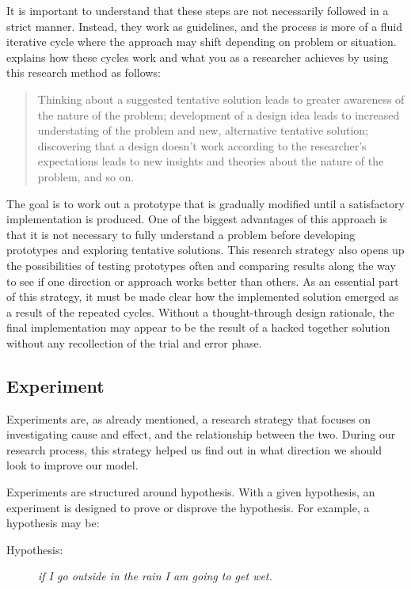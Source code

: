It is important to understand that these steps are not necessarily followed in a strict manner. Instead, they work as guidelines, and the process is more of a fluid iterative cycle where the approach may shift depending on problem or situation. \citep{oates2005researching} explains how these cycles work and what you as a researcher achieves by using this research method as follows:

\begin{quote}
    Thinking about a suggested tentative solution leads to greater awareness of the nature of the problem; development of a design idea leads to increased understating of the problem and new, alternative tentative solution; discovering that a design doesn't work according to the researcher's expectations leads to new insights and theories about the nature of the problem, and so on. 
\end{quote}

The goal is to work out a prototype that is gradually modified until a satisfactory implementation is produced. One of the biggest advantages of this approach is that it is not necessary to fully understand a problem before developing prototypes and exploring tentative solutions. This research strategy also opens up the possibilities of testing prototypes often and comparing results along the way to see if one direction or approach works better than others. As an essential part of this strategy, it must be made clear how the implemented solution emerged as a result of the repeated cycles. Without a thought-through design rationale, the final implementation may appear to be the result of a hacked together solution without any recollection of the trial and error phase.

\subsection{Experiment}
\label{sec:experiment}
Experiments are, as already mentioned, a research strategy that focuses on investigating cause and effect, and the relationship between the two. During our research process, this strategy helped us find out in what direction we should look to improve our model.

Experiments are structured around hypothesis. With a given hypothesis, an experiment is designed to prove or disprove the hypothesis. For example, a hypothesis may be:

\begin{description}
    \item[Hypothesis:]{\textit{if I go outside in the rain I am going to get wet.}}
\end{description}


